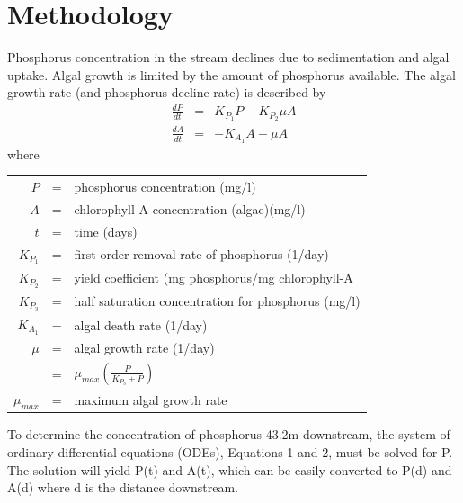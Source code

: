 \documentclass[titlepage,11pt]{article}
\begin{document}
\section{Methodology}
Phosphorus concentration in the stream declines due to sedimentation
and algal uptake.  Algal growth is limited by the amount of
phosphorus available.  The algal growth rate (and phosphorus decline
rate) is described by
\begin{eqnarray}
\frac{dP}{dt}&=&K_{P_1}P-K_{P_2}\mu A\\
\frac{dA}{dt}&=&-K_{A_1}A-\mu A
\end{eqnarray}
where
\begin{singlespacing}
\begin{center}
\begin{tabular}{rcl}
$P$&=&phosphorus concentration (mg/l)\\
$A$&=&chlorophyll-A concentration (algae)(mg/l)\\
$t$ &=&time (days)\\
$K_{P_1}$ &=&first order removal rate of phosphorus (1/day)\\
$K_{P_2}$ &=& yield coefficient (mg phosphorus/mg chlorophyll-A\\
$K_{P_3}$ &=& half saturation concentration for phosphorus (mg/l)\\
$K_{A_1}$ &=& algal death rate (1/day)\\
$\mu$ &=& algal growth rate (1/day)\\
 &=&$\mu_{max}\left(\frac{P}{K_{P_3}+P}\right)$\\
$\mu_{max}$ &=& maximum algal growth rate
\end{tabular}
\end{center}
\end{singlespacing}

To determine the concentration of phosphorus 43.2m downstream, the
system of ordinary differential equations (ODEs), Equations 1 and 2,
must be solved for P.  The solution will yield P(t) and A(t), which
can be easily converted to P(d) and A(d) where d is the distance
downstream.
\end{document}
